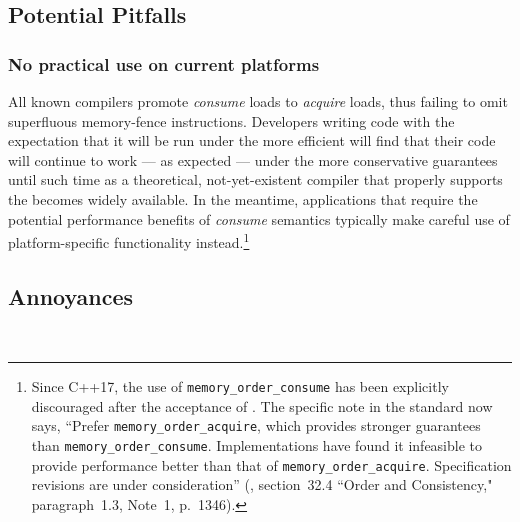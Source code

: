     

\subsection[Potential Pitfalls]{Potential Pitfalls}\label{potential-pitfalls}

\subsubsection[No practical use on current platforms]{No practical use on current platforms}\label{no-practical-use-on-current-platforms}

All known compilers promote \emph{consume} loads to \emph{acquire}
loads, thus failing to omit superfluous memory-fence instructions.
Developers writing code with the expectation that it will be run under
the more efficient   will find that their code will continue to work --- as
expected --- under the more conservative 
guarantees until such time as a theoretical, not-yet-existent compiler
that properly supports the 
 becomes widely available. In the
meantime, applications that require the potential performance benefits
of \emph{consume} semantics typically make careful use of platform-specific functionality instead.{\cprotect\footnote{Since C++17, the
use of \lstinline!memory_order_consume! has been explicitly
  discouraged after the acceptance of \cite{boehm16}. The specific
  note in the standard now says, ``Prefer
  \lstinline!memory_order_acquire!, which provides stronger guarantees
  than \lstinline!memory_order_consume!. Implementations have found it infeasible to provide performance better
  than that of \lstinline!memory_order_acquire!. Specification revisions
  are under consideration'' (\cite{iso17}, section~32.4 ``Order and Consistency," paragraph~1.3, Note~1, p.~1346). }}

\subsection[Annoyances]{Annoyances}\label{annoyances}

\hspace*{\fill}\\



